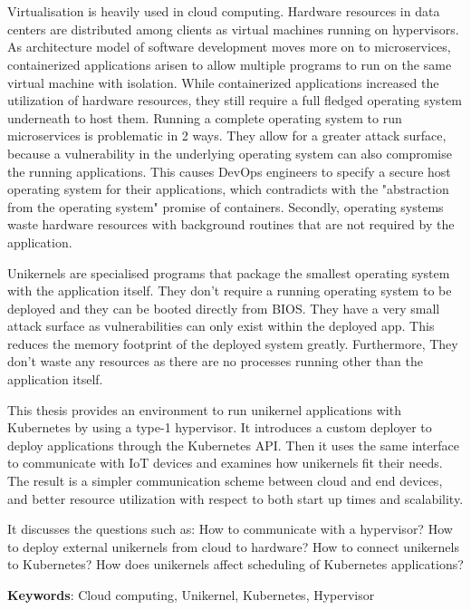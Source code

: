 \chapter{\abstractname}

Virtualisation is heavily used in cloud computing. Hardware resources in data centers are distributed among clients as virtual machines running on hypervisors. As architecture model of software development moves more on to microservices, containerized applications arisen to allow multiple programs to run on the same virtual machine with isolation. While containerized applications increased the utilization of hardware resources, they still require a full fledged operating system underneath to host them.
Running a complete operating system to run microservices is problematic in 2 ways. They allow for a greater attack surface, because a vulnerability in the underlying operating system can also compromise the running applications. This causes DevOps engineers to specify a secure host operating system for their applications, which contradicts with the "abstraction from the operating system" promise of containers. Secondly, operating systems waste hardware resources with background routines that are not required by the application.

Unikernels are specialised programs that package the smallest operating system with the application itself. They don't require a running operating system to be deployed and they can be booted directly from BIOS. They have a very small attack surface as vulnerabilities can only exist within the deployed app. This reduces the memory footprint of the deployed system greatly. Furthermore, They don't waste any resources as there are no processes running other than the application itself.

This thesis provides an environment to run unikernel applications with Kubernetes by using a type-1 hypervisor. It introduces a custom deployer to deploy applications through the Kubernetes API. Then it uses the same interface to communicate with IoT devices and examines how unikernels fit their needs. The result is a simpler communication scheme between cloud and end devices, and better resource utilization with respect to both start up times and scalability.

It discusses the questions such as: How to communicate with a hypervisor? How to deploy external unikernels from cloud to hardware? How to connect unikernels to Kubernetes? How does unikernels affect scheduling of Kubernetes applications?

\textbf{Keywords}: Cloud computing, Unikernel, Kubernetes, Hypervisor
